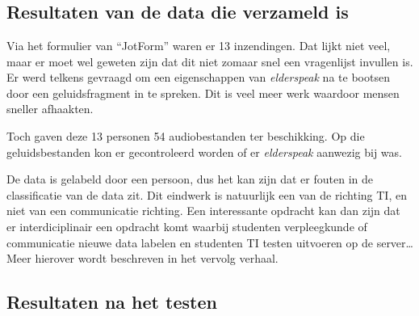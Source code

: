 
\chapter{}
\label{ch:resultaten}

\section{Resultaten van de data die verzameld is}
Via het formulier van ``JotForm'' waren er 13 inzendingen. Dat lijkt niet veel, maar er moet wel geweten zijn dat dit niet zomaar snel een vragenlijst invullen is. Er werd telkens gevraagd om een eigenschappen van \textit{elderspeak} na te bootsen door een geluidsfragment in te spreken. Dit is veel meer werk waardoor mensen sneller afhaakten.

Toch gaven deze 13 personen 54 audiobestanden ter beschikking. Op die geluidsbestanden kon er gecontroleerd worden of er \textit{elderspeak} aanwezig bij was.

De data is gelabeld door een persoon, dus het kan zijn dat er fouten in de classificatie van de data zit. Dit eindwerk is natuurlijk een van de richting TI, en niet van een communicatie richting. Een interessante opdracht kan dan zijn dat er interdiciplinair een opdracht komt waarbij studenten verpleegkunde of communicatie nieuwe data labelen en studenten TI testen uitvoeren op de server\ldots Meer hierover wordt beschreven in het vervolg verhaal.

\section{Resultaten na het testen}
